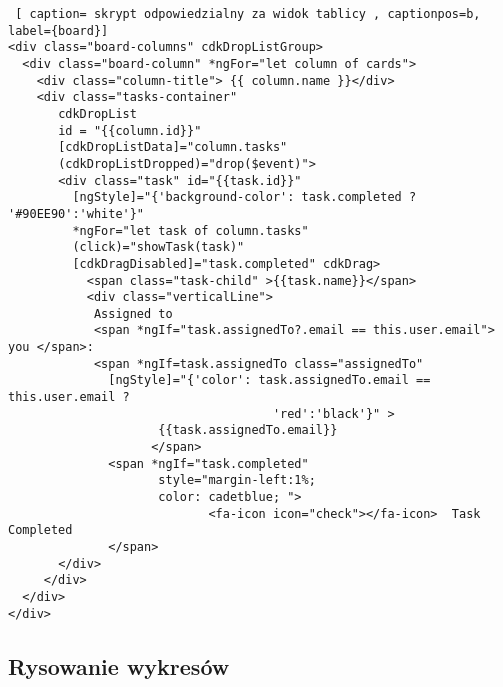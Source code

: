 \clearpage
\begin{lstlisting} [ caption= skrypt odpowiedzialny za widok tablicy , captionpos=b, label={board}]
<div class="board-columns" cdkDropListGroup>
  <div class="board-column" *ngFor="let column of cards">
    <div class="column-title"> {{ column.name }}</div>
    <div class="tasks-container"
       cdkDropList
       id = "{{column.id}}"
       [cdkDropListData]="column.tasks"
       (cdkDropListDropped)="drop($event)">	
       <div class="task" id="{{task.id}}" 
         [ngStyle]="{'background-color': task.completed ? '#90EE90':'white'}"
         *ngFor="let task of column.tasks" 
         (click)="showTask(task)" 
         [cdkDragDisabled]="task.completed" cdkDrag>
           <span class="task-child" >{{task.name}}</span>
           <div class="verticalLine">
            Assigned to
            <span *ngIf="task.assignedTo?.email == this.user.email"> you </span>:
            <span *ngIf=task.assignedTo class="assignedTo" 
              [ngStyle]="{'color': task.assignedTo.email == this.user.email ?
                                     'red':'black'}" >
                     {{task.assignedTo.email}}
                    </span>
              <span *ngIf="task.completed"  
                     style="margin-left:1%; 
                     color: cadetblue; ">
                            <fa-icon icon="check"></fa-icon>  Task Completed
              </span>
       </div>
     </div>
  </div>
</div>
\end{lstlisting}
\subsection{Rysowanie wykresów}